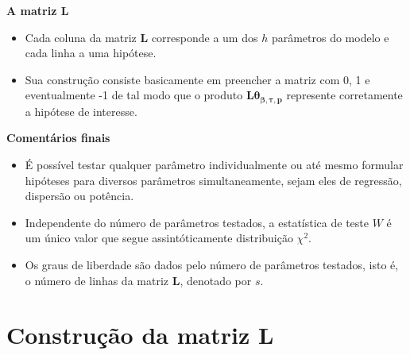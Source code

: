 \documentclass[10pt,
  aspectratio=169,
  serif,
  mathserif,
  professionalfont,
  compress,
  handout,
  ]{beamer}\usepackage[]{graphicx}\usepackage[]{color}
\begin{document}

\begin{frame}[c, allowframebreaks]

\textbf{A matriz \textbf{L}}

\begin{itemize}
  
  \item Cada coluna da matriz $\boldsymbol{L}$ corresponde a um dos $h$ parâmetros do modelo e cada linha a uma hipótese. 
  
  \item Sua construção consiste basicamente em preencher a matriz com 0, 1 e eventualmente -1 de tal modo que o produto $\boldsymbol{L}\boldsymbol{\theta_{\beta,\tau,p}}$ represente corretamente a hipótese de interesse.
  
\end{itemize}

\end{frame}


\begin{frame}[c, allowframebreaks]

\textbf{Comentários finais}

\begin{itemize}
  
  \item É possível testar qualquer parâmetro individualmente ou até mesmo formular hipóteses para diversos parâmetros simultaneamente, sejam eles de regressão, dispersão ou potência. 
  
  \item Independente do número de parâmetros testados, a estatística de teste $W$ é um único valor que segue assintóticamente distribuição $\chi^2$.
  
  \item Os graus de liberdade são dados pelo número de parâmetros testados, isto é, o número de linhas da matriz $\boldsymbol{L}$, denotado por $s$.
  
\end{itemize}

\end{frame}


\section{Construção da matriz L}
\end{document}
